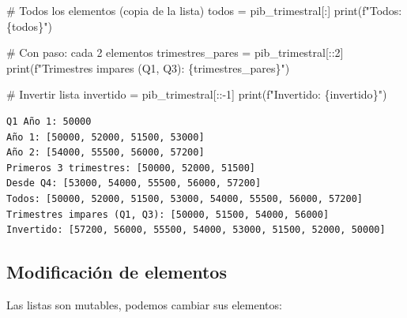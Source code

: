\documentclass[
  doc,
  floatsintext,
  longtable,
  a4paper,
  nolmodern,
  notxfonts,
  notimes,
  12pt,
  colorlinks=true,linkcolor=blue,citecolor=blue,urlcolor=blue]{apa7}
\newenvironment{Shaded}{\begin{snugshade}}{\end{snugshade}}
\newcommand{\BuiltInTok}[1]{\textcolor[rgb]{0.00,0.23,0.31}{#1}}
\newcommand{\CommentTok}[1]{\textcolor[rgb]{0.37,0.37,0.37}{#1}}
\newcommand{\DecValTok}[1]{\textcolor[rgb]{0.68,0.00,0.00}{#1}}
\newcommand{\NormalTok}[1]{\textcolor[rgb]{0.00,0.23,0.31}{#1}}
\newcommand{\OperatorTok}[1]{\textcolor[rgb]{0.37,0.37,0.37}{#1}}
\newcommand{\SpecialCharTok}[1]{\textcolor[rgb]{0.37,0.37,0.37}{#1}}
\newcommand{\SpecialStringTok}[1]{\textcolor[rgb]{0.13,0.47,0.30}{#1}}
\begin{document}
\begin{Shaded}
\begin{Highlighting}[]
\CommentTok{\# Todos los elementos (copia de la lista)}
\NormalTok{todos }\OperatorTok{=}\NormalTok{ pib\_trimestral[:]}
\BuiltInTok{print}\NormalTok{(}\SpecialStringTok{f"Todos: }\SpecialCharTok{\{}\NormalTok{todos}\SpecialCharTok{\}}\SpecialStringTok{"}\NormalTok{)}

\CommentTok{\# Con paso: cada 2 elementos}
\NormalTok{trimestres\_pares }\OperatorTok{=}\NormalTok{ pib\_trimestral[::}\DecValTok{2}\NormalTok{]}
\BuiltInTok{print}\NormalTok{(}\SpecialStringTok{f"Trimestres impares (Q1, Q3): }\SpecialCharTok{\{}\NormalTok{trimestres\_pares}\SpecialCharTok{\}}\SpecialStringTok{"}\NormalTok{)}

\CommentTok{\# Invertir lista}
\NormalTok{invertido }\OperatorTok{=}\NormalTok{ pib\_trimestral[::}\OperatorTok{{-}}\DecValTok{1}\NormalTok{]}
\BuiltInTok{print}\NormalTok{(}\SpecialStringTok{f"Invertido: }\SpecialCharTok{\{}\NormalTok{invertido}\SpecialCharTok{\}}\SpecialStringTok{"}\NormalTok{)}
\end{Highlighting}
\end{Shaded}

\begin{verbatim}
Q1 Año 1: 50000
Año 1: [50000, 52000, 51500, 53000]
Año 2: [54000, 55500, 56000, 57200]
Primeros 3 trimestres: [50000, 52000, 51500]
Desde Q4: [53000, 54000, 55500, 56000, 57200]
Todos: [50000, 52000, 51500, 53000, 54000, 55500, 56000, 57200]
Trimestres impares (Q1, Q3): [50000, 51500, 54000, 56000]
Invertido: [57200, 56000, 55500, 54000, 53000, 51500, 52000, 50000]
\end{verbatim}

\subsection{Modificación de
elementos}\label{modificaciuxf3n-de-elementos}

Las listas son mutables, podemos cambiar sus elementos:
\end{document}
